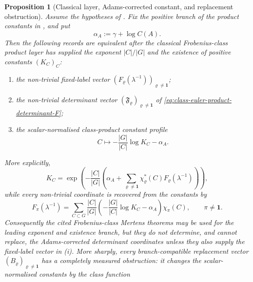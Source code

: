 \documentclass[11pt,a4paper]{amsart}
\theoremstyle{plain}
\newtheorem{proposition}[theorem]{Proposition}
\theoremstyle{definition}
\theoremstyle{remark}
\begin{document}
\begin{proposition}[Classical layer, Adams-corrected constant, and replacement obstruction]
  \label{prop:classical-layer-adams-corrected-constant-separation}
  Assume the hypotheses of .  Fix the
  positive branch of the product constants in
  , and put
  \[
    \alpha_A:=\gamma+\log C(A).
  \]
  Then the following records are equivalent after the classical
  Frobenius-class product layer has supplied the exponent \(|C|/|G|\) and the
  existence of positive constants \((K_C)_C\):
  \begin{enumerate}[label=\textup{(\roman*)},leftmargin=*]
    \item the non-trivial fixed-label vector
      \((F_\varrho(\lambda^{-1}))_{\varrho\neq\mathbf1}\);
    \item the non-trivial determinant vector
      \((\mathfrak F_\varrho)_{\varrho\neq\mathbf1}\) of
      \eqref{eq:class-euler-product-determinant-F};
    \item the scalar-normalised class-product constant profile
      \[
        C\longmapsto
        -\frac{|G|}{|C|}\log K_C-\alpha_A .
      \]
  \end{enumerate}
  More explicitly,
  \begin{equation}\label{eq:classical-layer-forward-calibration}
    K_C=
    \exp\!\left(
      -\frac{|C|}{|G|}
      \left(
        \alpha_A+
        \sum_{\varrho\neq\mathbf1}
          \chi_\varrho^\ast(C)F_\varrho(\lambda^{-1})
      \right)
    \right),
  \end{equation}
  while every non-trivial coordinate is recovered from the constants by
  \begin{equation}\label{eq:classical-layer-inverse-calibration}
    F_\pi(\lambda^{-1})
    =
    \sum_{C\subset G}
      \frac{|C|}{|G|}
      \left(
        -\frac{|G|}{|C|}\log K_C-\alpha_A
      \right)
      \chi_\pi(C),
    \qquad \pi\neq\mathbf1 .
  \end{equation}
  Consequently the cited Frobenius-class Mertens theorems may be used for the
  leading exponent and existence branch, but they do not determine, and cannot
  replace, the Adams-corrected determinant coordinates unless they also supply
  the fixed-label vector in \textup{(i)}.  More sharply, every
  branch-compatible replacement vector
  \((B_\varrho)_{\varrho\neq\mathbf1}\) has a completely measured obstruction:
  it changes the scalar-normalised constants by the class function
  \begin{equation}\label{eq:classical-layer-replacement-error}

\end{equation}
\end{proposition}
\end{document}
